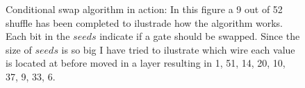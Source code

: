 \begin{figure}
\label{con_swap_fig}
\centering
\scalebox{1.5}{}
\caption{Conditional swap algorithm in action: In this figure a 9 out of 52 shuffle has been completed to ilustrade how the algorithm works. Each bit in the $seeds$ indicate if a gate should be swapped. Since the size of $seeds$ is so big I have tried to ilustrate which wire each value is located at before moved in a layer resulting in 1, 51, 14, 20, 10, 37, 9, 33, 6.}
\end{figure}
